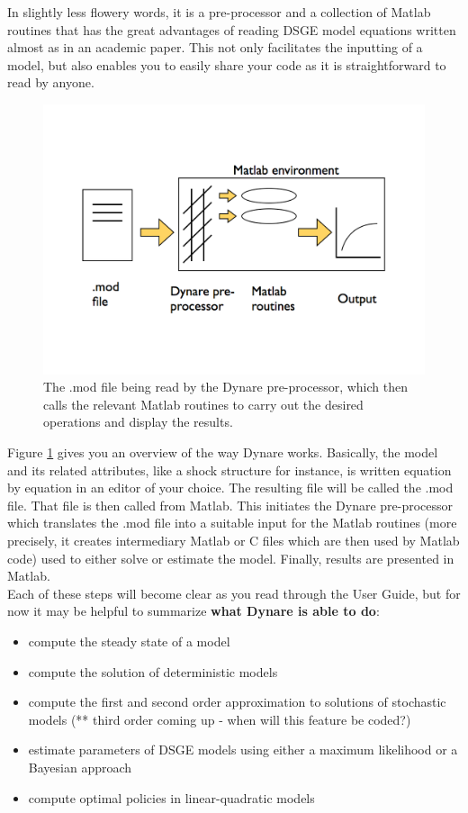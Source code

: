 In slightly less flowery words, it is a pre-processor and a collection of Matlab routines that has the great advantages of reading DSGE model equations written almost as in an academic paper. This not only facilitates the inputting of a model, but also enables you to easily share your code as it is straightforward to read by anyone.\\
\begin{figure} \label{fig:dyn}
\begin{center} 
\includegraphics[width=1.0\textwidth]{P_DynareStruct2} 
\end{center} 
\caption[Dynare, a bird's eyeview]{The .mod file being read by the Dynare pre-processor, which then calls the relevant Matlab routines to carry out the desired operations and display the results.} 
\end{figure}

Figure \ref{fig:dyn} gives you an overview of the way Dynare works. Basically, the model and its related attributes, like a shock structure for instance, is written equation by equation in an editor of your choice. The resulting file will be called the .mod file. That file is then called from Matlab. This initiates the Dynare pre-processor which translates the .mod file into a suitable input for the Matlab routines (more precisely, it creates intermediary Matlab or C files which are then used by Matlab code) used to either solve or estimate the model. Finally, results are presented in Matlab.\\

Each of these steps will become clear as you read through the User Guide, but for now it may be helpful to summarize \textbf{what Dynare is able to do}:
\begin{itemize}
\item compute the steady state of a model
\item compute the solution of deterministic models
\item compute the first and second order approximation to solutions of stochastic models (** third order coming up - when will this feature be coded?)
\item estimate parameters of DSGE models using either a maximum likelihood or a Bayesian approach
\item compute optimal policies in linear-quadratic models
\end{itemize}


